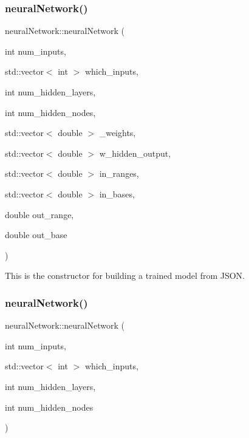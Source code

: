 \subsubsection{\texorpdfstring{neural\+Network()}{neuralNetwork()}\hspace{0.1cm}{\footnotesize\ttfamily [1/2]}}
{\footnotesize\ttfamily neural\+Network\+::neural\+Network (\begin{DoxyParamCaption}\item[{int}]{num\+\_\+inputs,  }\item[{std\+::vector$<$ int $>$}]{which\+\_\+inputs,  }\item[{int}]{num\+\_\+hidden\+\_\+layers,  }\item[{int}]{num\+\_\+hidden\+\_\+nodes,  }\item[{std\+::vector$<$ double $>$}]{\+\_\+weights,  }\item[{std\+::vector$<$ double $>$}]{w\+\_\+hidden\+\_\+output,  }\item[{std\+::vector$<$ double $>$}]{in\+\_\+ranges,  }\item[{std\+::vector$<$ double $>$}]{in\+\_\+bases,  }\item[{double}]{out\+\_\+range,  }\item[{double}]{out\+\_\+base }\end{DoxyParamCaption})}

This is the constructor for building a trained model from J\+S\+ON. \mbox{\label{classneural_network_ad5cad1e6ac86745ab47fceeb8d42cbd9}} 
\subsubsection{\texorpdfstring{neural\+Network()}{neuralNetwork()}\hspace{0.1cm}{\footnotesize\ttfamily [2/2]}}
{\footnotesize\ttfamily neural\+Network\+::neural\+Network (\begin{DoxyParamCaption}\item[{int}]{num\+\_\+inputs,  }\item[{std\+::vector$<$ int $>$}]{which\+\_\+inputs,  }\item[{int}]{num\+\_\+hidden\+\_\+layers,  }\item[{int}]{num\+\_\+hidden\+\_\+nodes }\end{DoxyParamCaption})}

